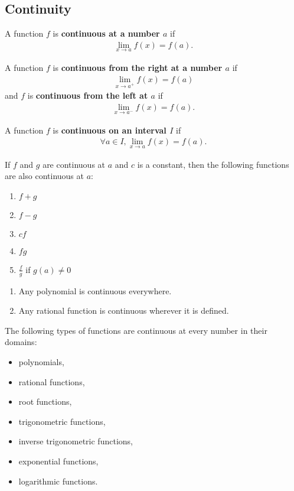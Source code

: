 \documentclass{article}
\begin{document}
\subsection{Continuity}
\begin{definition}
	A function $f$ is \textbf{continuous at a number $a$} if
	\begin{align*}
		\lim_{x\to a}f(x)=f(a).
	\end{align*}
\end{definition}
\begin{definition}
	A function $f$ is \textbf{continuous from the right at a number $a$} if
	\begin{align*}
		\lim_{x\to a^+}f(x) = f(a)
	\end{align*}
	and $f$ is \textbf{continuous from the left at $a$} if
	\begin{align*}
		\lim_{x\to a^-}f(x) = f(a).
	\end{align*}
\end{definition}
\begin{definition}
	A function $f$ is \textbf{continuous on an interval $I$} if
	\begin{align*}
		\forall a \in I, \lim_{x\to a}f(x) = f(a).
	\end{align*}
\end{definition}
\begin{theorem}
	If $f$ and $g$ are continuous at $a$ and $c$ is a constant, then the following functions are also continuous at $a$:
	\begin{enumerate}
		\item $f+g$
		\item $f-g$
		\item $cf$
		\item $fg$
		\item $\frac{f}{g}$ if $g(a)\not= 0$
	\end{enumerate}
\end{theorem}
\begin{theorem}
	\begin{enumerate}
		\item Any polynomial is continuous everywhere.
		\item Any rational function is continuous wherever it is defined.
	\end{enumerate}
\end{theorem}
\begin{theorem}
	The following types of functions are continuous at every number in their domains:
	\begin{itemize}
		\item polynomials,
		\item rational functions,
		\item root functions,
		\item trigonometric functions,
		\item inverse trigonometric functions,
		\item exponential functions,
		\item logarithmic functions.
	\end{itemize}
\end{theorem}
\end{document}
